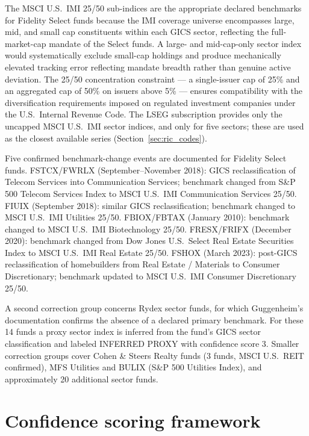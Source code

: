 \documentclass[12pt, oneside]{report}
\begin{document}
The MSCI U.S.\ IMI 25/50 sub-indices are the appropriate declared
benchmarks for Fidelity Select funds because the IMI coverage
universe encompasses large, mid, and small cap constituents within
each GICS sector, reflecting the full-market-cap mandate of the
Select funds. A large- and mid-cap-only sector index would
systematically exclude small-cap holdings and produce mechanically
elevated tracking error reflecting mandate breadth rather than
genuine active deviation. The 25/50 concentration constraint --- a
single-issuer cap of 25\% and an aggregated cap of 50\% on issuers
above 5\% --- ensures compatibility with the diversification
requirements imposed on regulated investment companies under the
U.S.\ Internal Revenue Code. The LSEG subscription provides only the
uncapped MSCI U.S.\ IMI sector indices, and only for five sectors; these
are used as the closest available series
(Section~\ref{sec:ric_codes}).

Five confirmed benchmark-change events are documented for Fidelity
Select funds. FSTCX/FWRLX (September--November
2018): GICS reclassification of Telecom Services into Communication
Services; benchmark changed from S\&P 500 Telecom Services Index to
MSCI U.S.\ IMI Communication Services 25/50. FIUIX
(September 2018): similar GICS reclassification; benchmark changed
to MSCI U.S.\ IMI Utilities 25/50. FBIOX/FBTAX
(January 2010): benchmark changed to MSCI U.S.\ IMI Biotechnology
25/50. FRESX/FRIFX
(December 2020): benchmark changed from Dow Jones U.S.\ Select Real
Estate Securities Index to MSCI U.S.\ IMI Real Estate 25/50.
FSHOX (March 2023): post-GICS reclassification of
homebuilders from Real Estate / Materials to Consumer Discretionary;
benchmark updated to MSCI U.S.\ IMI Consumer Discretionary 25/50.

A second correction group concerns Rydex sector funds, for which
Guggenheim's documentation confirms the absence of a declared
primary benchmark. For these 14 funds a proxy sector index is
inferred from the fund's GICS sector classification and labeled
INFERRED PROXY with confidence score 3. Smaller correction
groups cover Cohen \& Steers Realty funds (3 funds, MSCI U.S.\ REIT
confirmed), MFS Utilities and BULIX (S\&P 500 Utilities Index), and
approximately 20 additional sector funds.

\section{Confidence scoring framework}
\label{sec:confidence_scoring}
\end{document}
